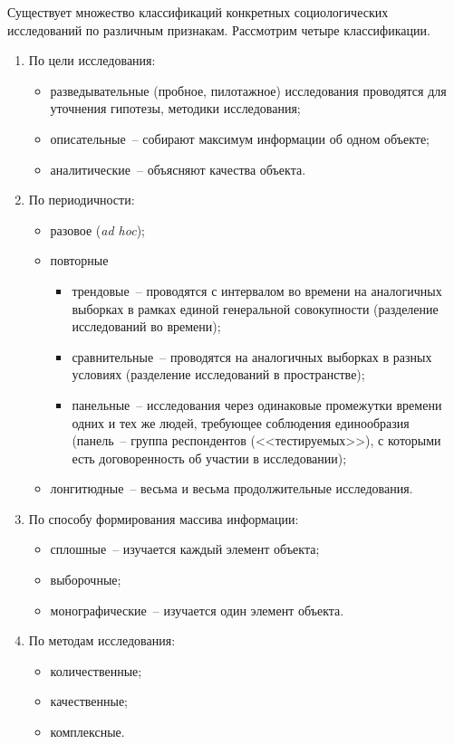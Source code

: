   Существует множество классификаций конкретных социологических исследований по
  различным признакам. Рассмотрим четыре классификации.
  \begin{enumerate}
    \item По цели исследования:
      \begin{itemize}
        \item разведывательные (пробное, пилотажное) исследования проводятся для
          уточнения гипотезы, методики исследования;
        \item описательные~-- собирают максимум информации об одном объекте;
        \item аналитические~-- объясняют качества объекта.
      \end{itemize}
    \item По периодичности:
      \begin{itemize}
        \item разовое (\emph{ad hoc});
        \item повторные
          \begin{itemize}
            \item трендовые~-- проводятся с интервалом во времени на аналогичных
              выборках в рамках единой генеральной совокупности (разделение
              исследований во времени);
            \item сравнительные~-- проводятся на аналогичных выборках в разных
              условиях (разделение исследований в пространстве);
            \item панельные~-- исследования через одинаковые промежутки времени
              одних и тех же людей, требующее соблюдения единообразия (панель~--
              группа респондентов (<<тестируемых>>), с которыми есть
              договоренность об участии в исследовании);
          \end{itemize}
        \item лонгитюдные~-- весьма и весьма продолжительные исследования.
      \end{itemize}
    \item По способу формирования массива информации:
      \begin{itemize}
        \item сплошные~-- изучается каждый элемент объекта;
        \item выборочные;
        \item монографические~-- изучается один элемент объекта.
      \end{itemize}
    \item По методам исследования:
      \begin{itemize}
        \item количественные;
        \item качественные;
        \item комплексные.
      \end{itemize}
  \end{enumerate}

